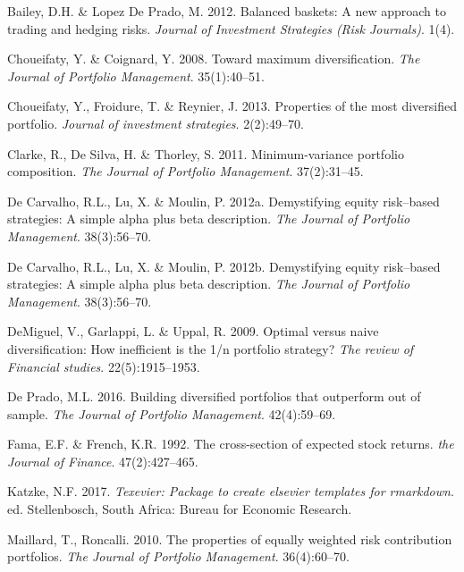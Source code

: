 \documentclass[11pt,preprint, authoryear]{elsarticle}
\numberwithin{equation}{section}
\numberwithin{figure}{section}
\numberwithin{table}{section}
\begin{document}
\hypertarget{refs}{}
\leavevmode\hypertarget{ref-lopez2012}{}%
Bailey, D.H. \& Lopez De Prado, M. 2012. Balanced baskets: A new
approach to trading and hedging risks. \emph{Journal of Investment
Strategies (Risk Journals)}. 1(4).

\leavevmode\hypertarget{ref-choueifaty2008}{}%
Choueifaty, Y. \& Coignard, Y. 2008. Toward maximum diversification.
\emph{The Journal of Portfolio Management}. 35(1):40--51.

\leavevmode\hypertarget{ref-choueifaty2013}{}%
Choueifaty, Y., Froidure, T. \& Reynier, J. 2013. Properties of the most
diversified portfolio. \emph{Journal of investment strategies}.
2(2):49--70.

\leavevmode\hypertarget{ref-clarke2011}{}%
Clarke, R., De Silva, H. \& Thorley, S. 2011. Minimum-variance portfolio
composition. \emph{The Journal of Portfolio Management}. 37(2):31--45.

\leavevmode\hypertarget{ref-rawl2012}{}%
De Carvalho, R.L., Lu, X. \& Moulin, P. 2012a. Demystifying equity
risk--based strategies: A simple alpha plus beta description. \emph{The
Journal of Portfolio Management}. 38(3):56--70.

\leavevmode\hypertarget{ref-leote}{}%
De Carvalho, R.L., Lu, X. \& Moulin, P. 2012b. Demystifying equity
risk--based strategies: A simple alpha plus beta description. \emph{The
Journal of Portfolio Management}. 38(3):56--70.

\leavevmode\hypertarget{ref-demiguel2009}{}%
DeMiguel, V., Garlappi, L. \& Uppal, R. 2009. Optimal versus naive
diversification: How inefficient is the 1/n portfolio strategy?
\emph{The review of Financial studies}. 22(5):1915--1953.

\leavevmode\hypertarget{ref-lopez}{}%
De Prado, M.L. 2016. Building diversified portfolios that outperform out
of sample. \emph{The Journal of Portfolio Management}. 42(4):59--69.

\leavevmode\hypertarget{ref-fama1992}{}%
Fama, E.F. \& French, K.R. 1992. The cross-section of expected stock
returns. \emph{the Journal of Finance}. 47(2):427--465.

\leavevmode\hypertarget{ref-Texevier}{}%
Katzke, N.F. 2017. \emph{Texevier: Package to create elsevier templates
for rmarkdown}. ed. Stellenbosch, South Africa: Bureau for Economic
Research.

\leavevmode\hypertarget{ref-maillard2010}{}%
Maillard, T., Roncalli. 2010. The properties of equally weighted risk
contribution portfolios. \emph{The Journal of Portfolio Management}.
36(4):60--70.
\end{document}
